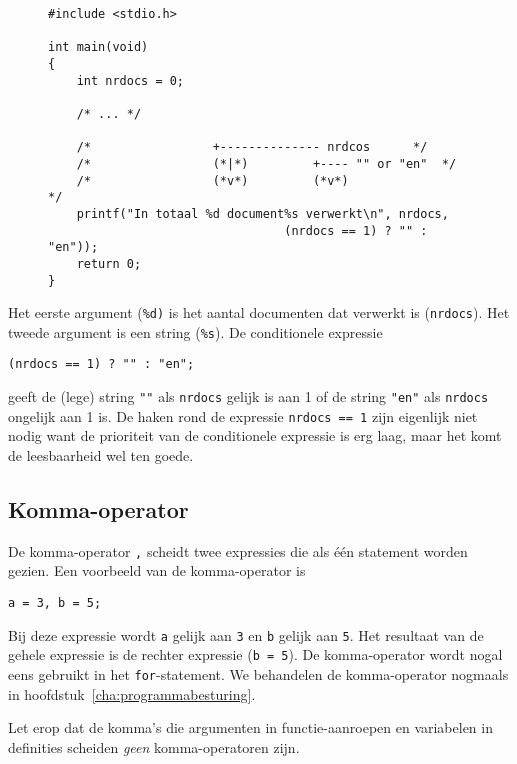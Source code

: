 \begin{figure}[!ht]
\begin{lstlisting}[caption=Het afdrukken van een meervoudsvorm.,label=cod:varnrdocs]
#include <stdio.h>

int main(void)
{
    int nrdocs = 0;

    /* ... */
    
    /*                 +-------------- nrdcos      */
    /*                 (*|*)         +---- "" or "en"  */
    /*                 (*v*)         (*v*)                 */
    printf("In totaal %d document%s verwerkt\n", nrdocs,
                                 (nrdocs == 1) ? "" : "en"));
    return 0;
}
\end{lstlisting}
\end{figure} 

Het eerste argument (\texttt{\%d)} is het aantal documenten dat verwerkt is (\texttt{nrdocs}). Het tweede argument is een string (\texttt{\%s}). De conditionele expressie

\begin{lstlisting}[style=lstoneline]
(nrdocs == 1) ? "" : "en";
\end{lstlisting}

geeft de (lege) string \lstinline[basicstyle=\ttfamily]|""| als \texttt{nrdocs} gelijk is aan 1 of de string \lstinline[basicstyle=\ttfamily]|"en"| als \texttt{nrdocs} ongelijk aan 1 is. De haken rond de expressie \texttt{nrdocs == 1} zijn eigenlijk niet nodig want de prioriteit van de conditionele expressie is erg laag, maar het komt de leesbaarheid wel ten goede.

\subsection{Komma-operator}
De komma-operator\indexop{,} \texttt{,} scheidt twee expressies die als één statement worden gezien. Een voorbeeld van de komma-operator is

\hspace*{1em}\texttt{a = 3, b = 5;}

Bij deze expressie wordt \texttt{a} gelijk aan \texttt{3} en \texttt{b} gelijk aan \texttt{5}. Het resultaat van de gehele expressie is de rechter expressie (\texttt{b = 5}). De komma-operator wordt nogal eens gebruikt in het \texttt{for}-statement. We behandelen de komma-operator nogmaals in hoofdstuk~\ref{cha:programmabesturing}.

Let erop dat de komma's die argumenten in functie-aanroepen en variabelen in definities scheiden \textsl{geen} komma-operatoren zijn.

